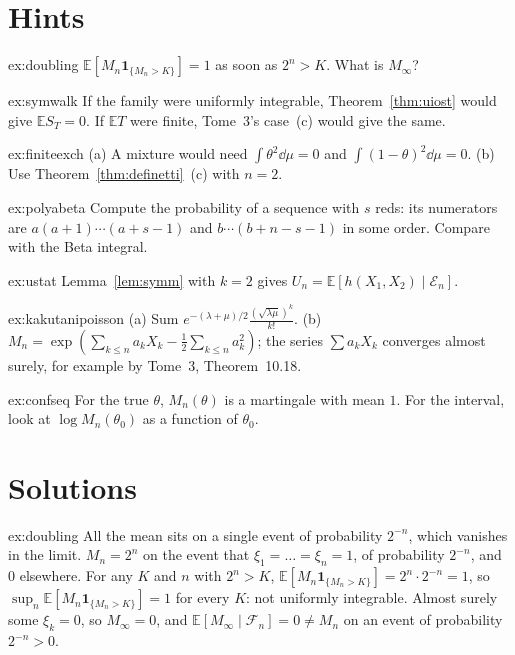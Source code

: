 \section{Hints}

\begin{hint}{ex:doubling}
$\mathbb E[M_n\mathbf 1_{\{M_n>K\}}]=1$ as soon as $2^n>K$. What is $M_\infty$?
\end{hint}
\begin{hint}{ex:symwalk}
If the family were uniformly integrable, Theorem~\ref{thm:uiost} would give $\mathbb ES_T=0$. If $\mathbb ET$ were finite, Tome~3's case~(c) would give the same.
\end{hint}
\begin{hint}{ex:finiteexch}
(a) A mixture would need $\int\theta^2\dd\mu=0$ and $\int(1-\theta)^2\dd\mu=0$. (b) Use Theorem~\ref{thm:definetti}~(c) with $n=2$.
\end{hint}
\begin{hint}{ex:polyabeta}
Compute the probability of a sequence with $s$ reds: its numerators are $a(a+1)\cdots(a+s-1)$ and $b\cdots(b+n-s-1)$ in some order. Compare with the Beta integral.
\end{hint}
\begin{hint}{ex:ustat}
Lemma~\ref{lem:symm} with $k=2$ gives $U_n=\mathbb E[h(X_1,X_2)\mid\mathcal E_n]$.
\end{hint}
\begin{hint}{ex:kakutanipoisson}
(a) Sum $e^{-(\lambda+\mu)/2}\frac{(\sqrt{\lambda\mu})^k}{k!}$. (b) $M_n=\exp(\sum_{k\le n}a_kX_k-\frac12\sum_{k\le n}a_k^2)$; the series $\sum a_kX_k$ converges almost surely, for example by Tome~3, Theorem~10.18.
\end{hint}
\begin{hint}{ex:confseq}
For the true $\theta$, $M_n(\theta)$ is a martingale with mean $1$. For the interval, look at $\log M_n(\theta_0)$ as a function of $\theta_0$.
\end{hint}

\section{Solutions}

\begin{solution}{ex:doubling}
\idea All the mean sits on a single event of probability $2^{-n}$, which vanishes in the limit.
\writeup $M_n=2^n$ on the event that $\xi_1=\dots=\xi_n=1$, of probability $2^{-n}$, and $0$ elsewhere. For any $K$ and $n$ with $2^n>K$, $\mathbb E[M_n\mathbf 1_{\{M_n>K\}}]=2^n\cdot2^{-n}=1$, so
$\sup_n\mathbb E[M_n\mathbf 1_{\{M_n>K\}}]=1$ for every $K$: not uniformly integrable. Almost surely some $\xi_k=0$, so $M_\infty=0$, and $\mathbb E[M_\infty\mid\mathcal F_n]=0\neq M_n$ on an event of probability $2^{-n}>0$.
\end{solution}

